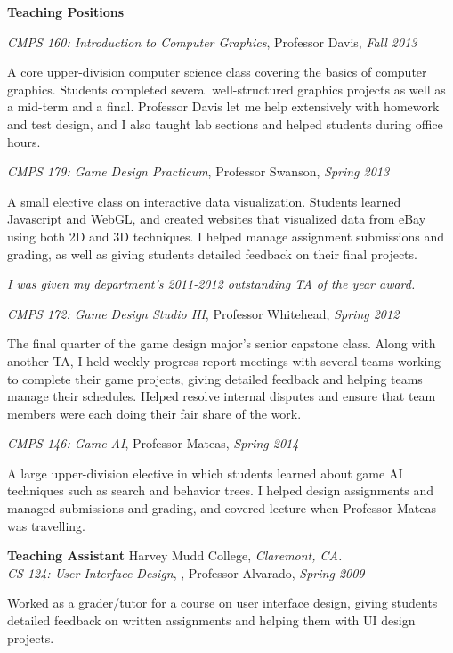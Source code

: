 \documentclass[11pt]{article}
\newenvironment{sct}[1]{%
  \vspace{8pt plus 2pt minus 4pt}\textbf{\Large #1} \hrulefill\vspace{6pt}
  \begin{adjustwidth}{6pt}{0pt}
}{%
  \end{adjustwidth}
}
\newcommand{\indented}[1]{\hspace*{\fill}\parbox{\textwidth-22pt}{#1}}
\newcommand{\teachingexperience}[7]{%
  \textbf{#1} #2, \textit{#3.} \\
  \textit{#4}, #5, \textit{#6} \\
  \indented{#7}
  \vspace{7pt plus 2pt minus 2pt}
}
\begin{document}
\begin{sct}{Teaching Positions}
{\textit{CMPS 160: Introduction to Computer Graphics}, Professor Davis, \textit{Fall 2013} \\
\indented{
  A core upper-division computer science class covering the basics of
  computer graphics. Students completed several well-structured graphics
  projects as well as a mid-term and a final. Professor Davis let me
  help extensively with homework and test design, and I also taught lab
  sections and helped students during office hours.
}
\vspace{6pt}

\textit{CMPS 179: Game Design Practicum}, Professor Swanson, \textit{Spring 2013} \\
\indented{
  A small elective class on interactive data visualization. Students
  learned Javascript and WebGL, and created websites that visualized
  data from eBay using both 2D and 3D techniques. I helped manage
  assignment submissions and grading, as well as giving students
  detailed feedback on their final projects.
}
\vspace{6pt}

\textit{I was given my department's 2011-2012 outstanding TA of the year award.}
\vspace{6pt}

\textit{CMPS 172: Game Design Studio III}, Professor Whitehead, \textit{Spring 2012} \\
\indented{
  The final quarter of the game design major's senior capstone class.
  Along with another TA, I held weekly progress report meetings with
  several teams working to complete their game projects, giving detailed
  feedback and helping teams manage their schedules. Helped resolve
  internal disputes and ensure that team members were each doing their
  fair share of the work.
}
\vspace{6pt}

\textit{CMPS 146: Game AI}, Professor Mateas, \textit{Spring 2014} \\
\indented{
  A large upper-division elective in which students learned about game
  AI techniques such as search and behavior trees. I helped design
  assignments and managed submissions and grading, and covered lecture
  when Professor Mateas was travelling.
}
}

\teachingexperience{Teaching Assistant}{Harvey Mudd College}{Claremont, CA}%
{CS 124: User Interface Design}{, Professor Alvarado}{Spring 2009}%
{Worked as a grader/tutor for a course on user interface design, giving
students detailed feedback on written assignments and helping them with
UI design projects.}


\end{sct}
\end{document}
